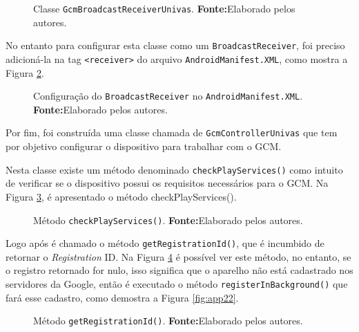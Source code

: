 	\begin{figure}[h!] 
		
		\caption[Classe GcmBroadcastReceiverUnivas]{Classe
		\texttt{GcmBroadcastReceiverUnivas}.
		\textbf{Fonte:}Elaborado pelos autores.}
		\label{fig:app18}
	\end{figure}
		
	\par No entanto para configurar esta classe como um \texttt{BroadcastReceiver},
foi preciso adicioná-la na tag \texttt{<receiver>} do arquivo
\texttt{AndroidManifest.XML}, como mostra a Figura \ref{fig:app19}.

	\begin{figure}[h!] 
		
		\caption[Configuração do BroadcastReceiver no
		AndroidManifest.XML]{Configuração do \texttt{BroadcastReceiver} no
		\texttt{AndroidManifest.XML}.
		\textbf{Fonte:}Elaborado pelos autores.}
		\label{fig:app19}
	\end{figure}

	\par Por fim, foi construída uma classe chamada de \texttt{GcmControllerUnivas}
que tem por objetivo configurar o dispositivo para trabalhar com o GCM.

	\par Nesta classe existe um método denominado \texttt{checkPlayServices()} como
intuito de verificar se o dispositivo possui os requisitos necessários para o
GCM. Na Figura \ref{fig:app20}, é apresentado o método checkPlayServices().

	\begin{figure}[h!] 
		
		\caption[Método checkPlayServices()]{Método \texttt{checkPlayServices()}.
		\textbf{Fonte:}Elaborado pelos autores.}
		\label{fig:app20}
	\end{figure}
	
	\pagebreak
	
	\par Logo após é chamado o método \texttt{getRegistrationId()}, que é incumbido
de retornar o \textit{Registration} ID. Na Figura \ref{fig:app21} é possível ver
este método, no entanto, se o registro retornado for nulo, isso significa que o
aparelho não está cadastrado nos servidores da Google, então é executado o
método \texttt{registerInBackground()} que fará esse cadastro, como demostra a
Figura \ref{fig:app22}.

	\begin{figure}[h!] 
		
		\caption[Método getRegistrationId()]{Método \texttt{getRegistrationId()}.
		\textbf{Fonte:}Elaborado pelos autores.}
		\label{fig:app21}
	\end{figure}
	
